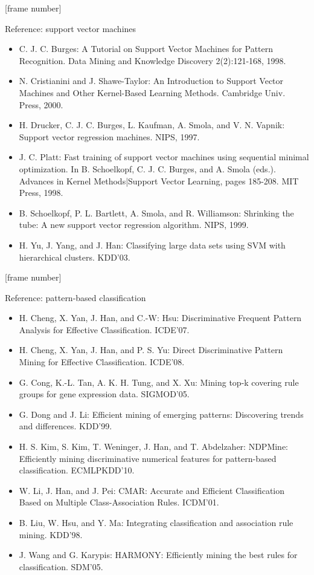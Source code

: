 \documentclass[aspectratio=169,t,table]{beamer}
\begin{document}
  {
    [frame number]
    \begin{frame}{Reference: support vector machines}
      \begin{itemize}
        \item C. J. C. Burges: A Tutorial on Support Vector Machines for Pattern Recognition. Data Mining and Knowledge Discovery 2(2):121-168, 1998.
        \item N. Cristianini and J. Shawe-Taylor: An Introduction to Support Vector Machines and Other Kernel-Based Learning Methods. Cambridge Univ. Press, 2000.
        \item H. Drucker, C. J. C. Burges, L. Kaufman, A. Smola, and V. N. Vapnik: Support vector regression machines. NIPS, 1997.
        \item J. C. Platt: Fast training of support vector machines using sequential minimal optimization. In B. Schoelkopf, C. J. C. Burges, and A. Smola (eds.). Advances in Kernel Methods|Support Vector Learning, pages 185-208. MIT Press, 1998.
        \item B. Schoelkopf, P. L. Bartlett, A. Smola, and R. Williamson: Shrinking the tube: A new support vector regression algorithm. NIPS, 1999.
        \item H. Yu, J. Yang, and J. Han: Classifying large data sets using SVM with hierarchical clusters. KDD'03.
      \end{itemize}
    \end{frame}
  }

  {
    [frame number]
    \begin{frame}{Reference: pattern-based classification}
      \begin{itemize}
        \item H. Cheng, X. Yan, J. Han, and C.-W: Hsu: Discriminative Frequent Pattern Analysis for Effective Classification. ICDE'07.
        \item H. Cheng, X. Yan, J. Han, and P. S. Yu: Direct Discriminative Pattern Mining for Effective Classification. ICDE'08.
        \item G. Cong, K.-L. Tan, A. K. H. Tung, and X. Xu: Mining top-k covering rule groups for gene expression data. SIGMOD'05.
        \item G. Dong and J. Li: Efficient mining of emerging patterns: Discovering trends and differences. KDD'99.
        \item H. S. Kim, S. Kim, T. Weninger, J. Han, and T. Abdelzaher: NDPMine: Efficiently mining discriminative numerical features for pattern-based classification. ECMLPKDD'10.
        \item W. Li, J. Han, and J. Pei: CMAR: Accurate and Efficient Classification Based on Multiple Class-Association Rules. ICDM'01.
        \item B. Liu, W. Hsu, and Y. Ma: Integrating classification and association rule mining. KDD'98.
        \item J. Wang and G. Karypis: HARMONY: Efficiently mining the best rules for classification. SDM'05.
      \end{itemize}
    \end{frame}
  }
\end{document}
